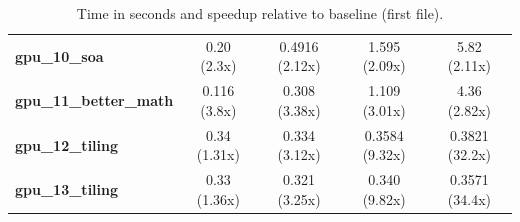 \begin{table}[H]
\begin{tabular}{|l|c|c|c|c|}
        \textbf{gpu\_10\_soa}             & 0.20 (2.3x)   & 0.4916 (2.12x)  & 1.595 (2.09x)   & 5.82 (2.11x)    \\

        \textbf{gpu\_11\_better\_math}    & 0.116 (3.8x)  & 0.308 (3.38x)   & 1.109 (3.01x)   & 4.36 (2.82x)    \\

        \textbf{gpu\_12\_tiling}          & 0.34 (1.31x)  & 0.334 (3.12x)   & 0.3584 (9.32x)  & 0.3821 (32.2x)  \\

        \textbf{gpu\_13\_tiling}          & 0.33 (1.36x)  & 0.321 (3.25x)   & 0.340 (9.82x)   & 0.3571 (34.4x)  \\

        \hline
    \end{tabular}
    \caption{Time in seconds and speedup relative to baseline (first file).}
    \label{tab:cpu-timings}
\end{table}
